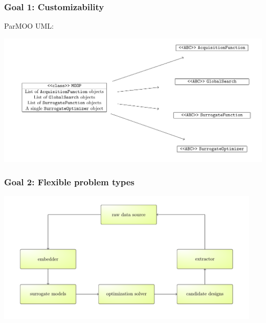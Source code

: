 \documentclass[aspectratio=169]{beamer}
\begin{document}
\begin{frame}\frametitle{Goal 1: Customizability}
ParMOO UML:\\
\begin{center}
\includegraphics[width=\textwidth]{uml-diagram-1.pdf}
\end{center}
\end{frame}

\begin{frame}\frametitle{Goal 2: Flexible problem types}
\begin{center}
\includegraphics[width=0.95\textwidth]{embedder-extractor.pdf}
\end{center}
\end{frame}
\end{document}
